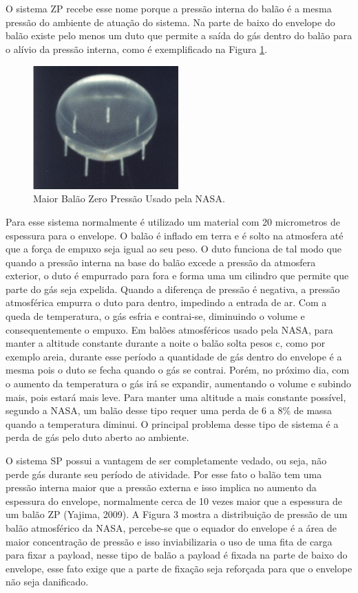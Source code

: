 	O sistema ZP recebe esse nome porque a pressão interna do balão é a mesma  pressão do ambiente de atuação do sistema. Na parte de baixo do envelope do balão existe pelo menos um duto que permite a saída do gás dentro do balão para o alívio da pressão interna, como é exemplificado na Figura \ref{img:maiorBalaoZeroPressao}.

	\begin{figure}[H]
		\centering
		\includegraphics[width=0.5\textwidth]{figuras/maiorBalaoZeroPressao}
		\caption{Maior Balão Zero Pressão Usado pela NASA.}
		\label{img:maiorBalaoZeroPressao}
	\end{figure}

	Para esse sistema normalmente é utilizado um material com 20 micrometros de espessura para o envelope. O balão é inflado em terra e é solto na atmosfera até que a força de empuxo seja igual ao seu peso. O duto funciona de tal modo que quando a pressão interna na base do balão excede a pressão da atmosfera exterior, o duto é empurrado para fora e forma uma um cilindro que permite que parte do gás seja expelida. Quando a diferença de pressão é negativa, a pressão atmosférica empurra o duto para dentro, impedindo a entrada de ar. Com a queda de temperatura, o gás esfria e contrai-se, diminuindo o volume e consequentemente o empuxo. Em balões atmosféricos usado pela NASA, para manter a altitude constante durante a noite o balão solta pesos c, como por exemplo areia, durante esse período a quantidade de gás dentro do envelope é a mesma pois o duto se fecha quando o gás se contrai. Porém, no próximo dia, com o aumento da temperatura o gás irá se expandir, aumentando o volume e subindo mais, pois estará mais leve. Para manter uma altitude a mais constante possível, segundo a NASA, um balão desse tipo requer uma perda de 6 a 8\% de massa quando a temperatura diminui. O principal problema desse tipo de sistema é a perda de gás pelo duto aberto ao ambiente. 

	O sistema SP possui a vantagem de ser completamente vedado, ou seja, não perde gás durante seu período de atividade. Por esse fato o balão tem uma pressão interna maior que a pressão externa e isso implica no aumento da espessura do envelope, normalmente cerca de 10 vezes maior que a espessura de um balão ZP (Yajima, 2009). A Figura 3 mostra a distribuição de pressão de um balão atmosférico da NASA, percebe-se que o equador do envelope é a área de maior concentração de pressão e isso inviabilizaria o uso de uma fita de carga para fixar a payload, nesse tipo de balão a payload é fixada na parte de baixo do envelope, esse fato exige que a parte de fixação seja reforçada para que o envelope não seja danificado.

